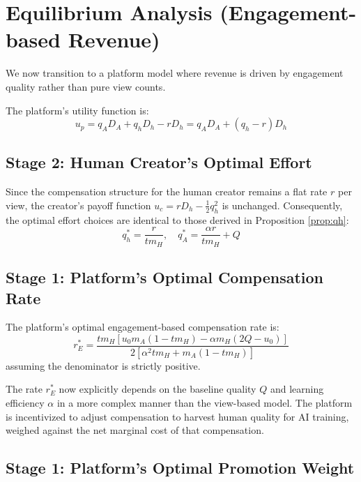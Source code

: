\documentclass[mnsc,nonblindrev]{informs3_NoOR}
\begin{document}
\section{Equilibrium Analysis (Engagement-based Revenue)}
\label{sec:analysis}
We now transition to a platform model where revenue is driven by engagement quality rather than pure view counts.

The platform's utility function is:
\begin{equation}
u_{p} = q_{A}D_{A} + q_{h}D_{h} - r D_{h} = q_{A}D_{A} + (q_{h} - r)D_{h}
\end{equation}

\subsection{Stage 2: Human Creator's Optimal Effort}

Since the compensation structure for the human creator remains a flat rate $r$ per view, the creator's payoff function $u_{c} = r D_{h} - \frac{1}{2}q_{h}^{2}$ is unchanged. Consequently, the optimal effort choices are identical to those derived in Proposition \ref{prop:qh}:
\begin{equation}
q_{h}^{*} = \frac{r}{tm_{H}}, \quad q_{A}^{*} = \frac{\alpha r}{tm_{H}} + Q
\end{equation}

\subsection{Stage 1: Platform's Optimal Compensation Rate}


\begin{proposition}
\label{prop:r(eng)}
The platform's optimal engagement-based compensation rate is:
\begin{equation}
r_{E}^{*} = \frac{tm_{H} [ u_{0}m_{A}(1 - tm_{H}) - \alpha m_{H}(2Q - u_{0}) ]}{2 [ \alpha^{2}tm_{H} + m_{A}(1 - tm_{H}) ]}
\end{equation}
assuming the denominator is strictly positive.
\end{proposition}

The rate $r_{E}^{*}$ now explicitly depends on the baseline quality $Q$ and learning efficiency $\alpha$ in a more complex manner than the view-based model. The platform is incentivized to adjust compensation to harvest human quality for AI training, weighed against the net marginal cost of that compensation.

\subsection{Stage 1: Platform's Optimal Promotion Weight}
\end{document}
